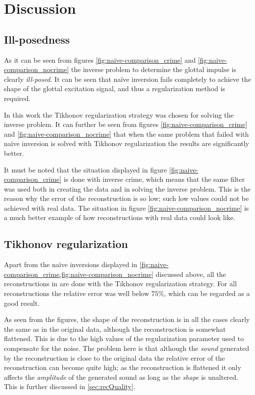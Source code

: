 \documentclass[12pt,a4]{article}
\begin{document}
\section{Discussion}
\label{sec:discussion}

\subsection{Ill-posedness}

As it can be seen from figures \ref{fig:naive-comparison_crime} and \ref{fig:naive-comparison_nocrime} the inverse problem to determine the glottal impulse is clearly \emph{ill-posed}. It can be seen that naïve inversion fails completely to achieve the shape of the glottal excitation signal, and thus a regularization method is required.

In this work the Tikhonov regularization strategy was chosen for solving the inverse problem. It can further be seen from figures \ref{fig:naive-comparison_crime} and \ref{fig:naive-comparison_nocrime} that when the same problem that failed with naïve inversion is solved with Tikhonov regularization the results are significantly better.

It must be noted that the situation displayed in figure \ref{fig:naive-comparison_crime} is done with inverse crime, which means that the same filter was used both in creating the data and in solving the inverse problem. This is the reason why the error of the reconstruction is so low; such low values could not be achieved with real data. The situation in figure \ref{fig:naive-comparison_nocrime} is a much better example of how reconstructions with real data could look like.

\subsection{Tikhonov regularization}
\label{sec:tikDiscussion}

Apart from the naïve inversions displayed in \cref{fig:naive-comparison_crime,fig:naive-comparison_nocrime} discussed above, all the reconstructions in  are done with the Tikhonov regularization strategy. For all reconstructions the relative error was well below $75 \%$, which can be regarded as a good result.

As seen from the figures, the shape of the reconstruction is in all the cases clearly the same as in the original data, although the reconstruction is somewhat flattened. This is due to the high values of the regularization parameter used to compensate for the noise. The problem here is that although the \emph{sound} generated by the reconstruction is close to the original data the relative error of the reconstruction can become quite high; as the reconstruction is flattened it only affects the \emph{amplitude} of the generated sound as long as the \emph{shape} is unaltered. This is further discussed in \cref{sec:recQuality}.
\end{document}
